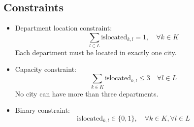 \documentclass{article}
\begin{document}
\subsection*{Constraints}
\begin{itemize}
    \item Department location constraint:
    \[
    \sum_{l \in L} \text{islocated}_{k,l} = 1, \quad \forall k \in K
    \]
    Each department must be located in exactly one city.

    \item Capacity constraint:
    \[
    \sum_{k \in K} \text{islocated}_{k,l} \leq 3 \quad \forall l \in L
    \]
    No city can have more than three departments.

    \item Binary constraint:
    \[
    \text{islocated}_{k,l} \in \{0, 1\}, \quad \forall k \in K, \forall l \in L
    \]
\end{itemize}
\end{document}
